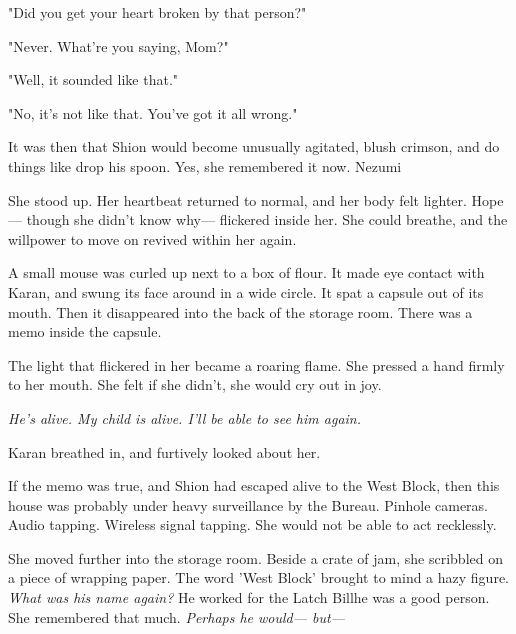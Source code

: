 "Did you get your heart broken by that person?"

"Never. What're you saying, Mom?"

"Well, it sounded like that."

"No, it's not like that. You've got it all wrong."

It was then that Shion would become unusually agitated, blush crimson,
and do things like drop his spoon. Yes, she remembered it now. Nezumi\el 

She stood up. Her heartbeat returned to normal, and her body felt
lighter. Hope--- though she didn't know why--- flickered inside her. She
could breathe, and the willpower to move on revived within her again.

A small mouse was curled up next to a box of flour. It made eye contact
with Karan, and swung its face around in a wide circle. It spat a
capsule out of its mouth. Then it disappeared into the back of the
storage room. There was a memo inside the capsule.


The light that flickered in her became a roaring flame. She pressed a
hand firmly to her mouth. She felt if she didn't, she would cry out in
joy.

\emph{He's alive. My child is alive. I'll be able to see him again.}

Karan breathed in, and furtively looked about her.

If the memo was true, and Shion had escaped alive to the West Block,
then this house was probably under heavy surveillance by the Bureau.
Pinhole cameras. Audio tapping. Wireless signal tapping. She would not
be able to act recklessly.

She moved further into the storage room. Beside a crate of jam, she
scribbled on a piece of wrapping paper. The word 'West Block' brought to
mind a hazy figure. \emph{What was his name again?} He worked for the Latch
Bill\el he was a good person. She remembered that much. \emph{Perhaps he
would--- but---}

